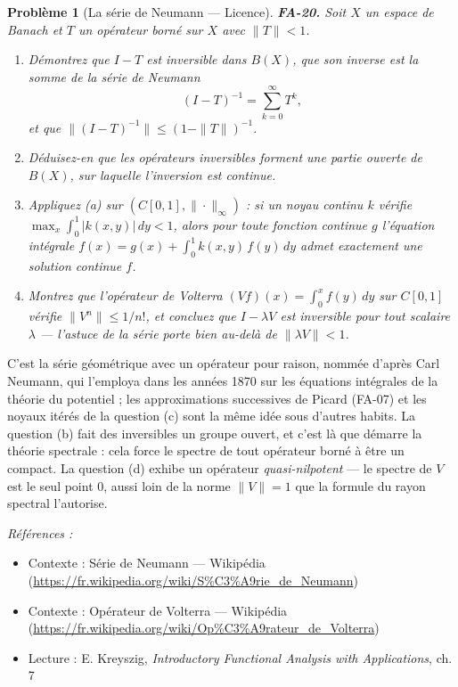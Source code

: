 \documentclass[11pt]{article}
\newtheorem{problem}{Problème}
\newenvironment{refs}{\par\small\noindent\emph{Références :}\begin{itemize}\setlength\itemsep{0pt}}{\end{itemize}\normalsize}
\begin{document}
\bigskip

\begin{problem}[{La série de Neumann --- Licence}]
\textbf{FA-20.} Soit $ X $ un espace de Banach et $ T $ un opérateur borné sur $ X $ avec
$ \|T\| < 1 $.
\begin{enumerate}
\item[(a)] Démontrez que $ I - T $ est inversible dans $ B(X) $, que son inverse est la somme de la
\textit{série de Neumann}
\[ (I-T)^{-1} = \sum_{k=0}^{\infty} T^{k} , \]
et que $ \|(I-T)^{-1}\| \le (1 - \|T\|)^{-1} $.
\item[(b)] Déduisez-en que les opérateurs inversibles forment une partie ouverte de $ B(X) $, sur laquelle
l'inversion est continue.
\item[(c)] Appliquez (a) sur $ (C[0,1], \|\cdot\|_\infty) $ : si un noyau continu $ k $ vérifie
$ \max_x \int_0^1 |k(x,y)|\,dy < 1 $, alors pour toute fonction continue $ g $ l'équation
intégrale $ f(x) = g(x) + \int_0^1 k(x,y)\,f(y)\,dy $ admet exactement une solution continue
$ f $.
\item[(d)] Montrez que l'opérateur de Volterra $ (Vf)(x) = \int_0^x f(y)\,dy $ sur $ C[0,1] $ vérifie
$ \|V^n\| \le 1/n! $, et concluez que $ I - \lambda V $ est inversible pour \textit{tout} scalaire
$ \lambda $ --- l'astuce de la série porte bien au-delà de $ \|\lambda V\| < 1 $.
\end{enumerate}

\end{problem}

\noindent C'est la série géométrique avec un opérateur pour raison, nommée d'après Carl
Neumann, qui l'employa dans les années 1870 sur les équations intégrales de la théorie du potentiel ;
les approximations successives de Picard (FA-07) et les noyaux itérés de la question (c) sont la même
idée sous d'autres habits. La question (b) fait des inversibles un groupe ouvert, et c'est là que
démarre la théorie spectrale : cela force le spectre de tout opérateur borné à être un compact. La
question (d) exhibe un opérateur \textit{quasi-nilpotent} --- le spectre de $ V $ est le seul point
$ 0 $, aussi loin de la norme $ \|V\| = 1 $ que la formule du rayon spectral l'autorise.

\begin{refs}
\item Contexte : Série de Neumann --- Wikipédia (\url{https://fr.wikipedia.org/wiki/S%C3%A9rie_de_Neumann})
\item Contexte : Opérateur de Volterra --- Wikipédia (\url{https://fr.wikipedia.org/wiki/Op%C3%A9rateur_de_Volterra})
\item Lecture : E. Kreyszig, \textit{Introductory Functional Analysis with Applications}, ch. 7
\end{refs}
\end{document}
